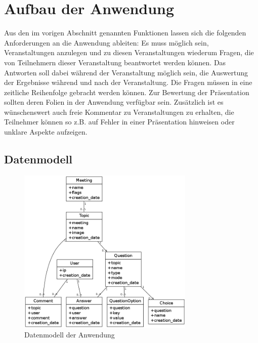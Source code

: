 \section{Aufbau der Anwendung}

Aus den im vorigen Abschnitt genannten Funktionen lassen sich die folgenden Anforderungen an die Anwendung ableiten: Es muss möglich sein, Veranstaltungen anzulegen und zu diesen Veranstaltungen wiederum Fragen, die von Teilnehmern dieser Veranstaltung beantwortet werden können. Das Antworten soll dabei während der Veranstaltung möglich sein, die Auswertung der Ergebnisse während und nach der Veranstaltung. Die Fragen müssen in eine zeitliche Reihenfolge gebracht werden können. Zur Bewertung der Präsentation sollten deren Folien in der Anwendung verfügbar sein. Zusätzlich ist es wünschenswert auch freie Kommentar zu Veranstaltungen zu erhalten, die Teilnehmer können so z.B. auf Fehler in einer Präsentation hinweisen oder unklare Aspekte aufzeigen.

\subsection{Datenmodell}

\begin{figure}[htb]
\begin{center}
\includegraphics[width=0.75\textwidth]{media/models.png}
\end{center}
\caption{Datenmodell der Anwendung}
\label{f:models}
\end{figure}


